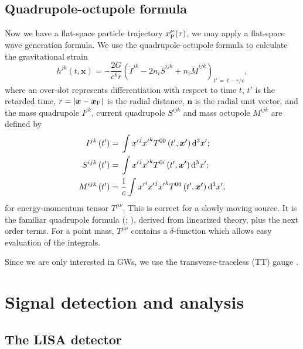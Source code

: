 \subsection{Quadrupole-octupole formula}

Now we have a flat-space particle trajectory $x_\mathrm{P}^\mu(\tau)$, we may apply a flat-space wave generation formula. We use the quadrupole-octupole formula to calculate the gravitational strain \citep{Bekenstein1973, Press1977, Yunes2008}
\begin{equation}
h^{jk}(t, \boldsymbol{x}) = -\frac{2G}{c^6r}\left(\ddot{I}^{jk} - 2n_i\ddot{S}^{ijk} + n_i\dddot{M}^{ijk}\right)_{t'\, =\, t - r/c},
\label{eq:octupole}
\end{equation}
where an over-dot represents differentiation with respect to time $t$, $t'$ is the retarded time, $r = \left|\boldsymbol{x} - \boldsymbol{x}_\mathrm{P}\right|$ is the radial distance, $\boldsymbol{n}$ is the radial unit vector, and the mass quadrupole ${I}^{jk}$, current quadrupole ${S}^{ijk}$ and mass octupole ${M}^{ijk}$ are defined by
\begin{subequations}
\begin{align}
{I}^{jk}\left(t'\right) = {} & \int_{}^{}{{x'}^j{x'}^kT^{00}\left(t', \boldsymbol{x'}\right) }\,\mathrm{d}{^3x'};\\
{S}^{ijk}\left(t'\right) = {} & \int_{}^{}{{x'}^j{x'}^kT^{0i}\left(t', \boldsymbol{x'}\right)}\,\mathrm{d}{^3x'};\\
{M}^{ijk}\left(t'\right)  = {} & \frac{1}{c}\int_{}^{}{{x'}^i{x'}^j{x'}^kT^{00}\left(t', \boldsymbol{x'}\right)}\,\mathrm{d}{^3x'},
\end{align}
\end{subequations}
for energy-momentum tensor $T^{\mu\nu}$. This is correct for a slowly moving source. It is the familiar quadrupole formula \linebreak[0] (\citealt[section 36.10]{Misner1973}; \citealt[section 17.9]{Hobson2006}), derived from linearized theory, plus the next order terms. For a point mass, $T^{\mu\nu}$ contains a $\delta$-function which allows easy evaluation of the integrals.

Since we are only interested in GWs, we use the transverse-traceless (TT) gauge \citep[box 35.1]{Misner1973}.

\section{Signal detection and analysis}\label{sec:Signal}

\subsection{The LISA detector}\label{sec:Detector}

